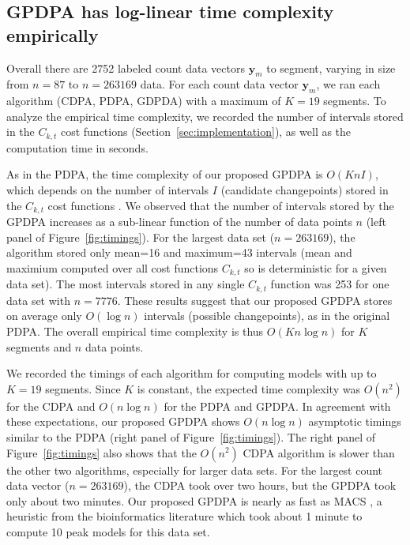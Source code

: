 \documentclass[twoside,11pt]{article}
\begin{document}
\subsection{GPDPA has log-linear time complexity empirically}
\label{sec:results_time}

Overall there are 2752 labeled count data vectors $\mathbf y_m$ to segment,
varying in size from $n=87$ to $n=263169$ data. For each count data
vector $\mathbf y_m$, we ran each algorithm (CDPA, PDPA, GDPDA) with a
maximum of $K=19$ segments.
To analyze the empirical time complexity,
we recorded the number of intervals stored in the $C_{k,t}$ cost
functions (Section~\ref{sec:implementation}), as well as the computation
time in seconds.


As in the PDPA, the time complexity of our proposed GPDPA is
$O(K n I)$, which depends on the number of intervals $I$ (candidate
changepoints) stored in the $C_{k,t}$ cost functions
\citep{pruned-dp-new}. We observed that the number of intervals stored
by the GPDPA increases as a sub-linear function of the number of data
points $n$ (left panel of Figure~\ref{fig:timings}). For the largest data
set ($n=263169$), the algorithm stored only mean=16 and maximum=43
intervals (mean and maximium computed over all cost functions
$C_{k,t}$ so is deterministic for a given data set). The most
intervals stored in any single $C_{k,t}$ function was 253 for one data set with $n=7776$. These results
suggest that our proposed GPDPA stores on average only $O(\log n)$
intervals (possible changepoints), as in the original PDPA. The
overall empirical time complexity is thus $O(K n \log n)$ for $K$
segments and $n$ data points.

We recorded the timings of each algorithm for computing models with up
to $K=19$ segments. Since $K$ is constant, the expected time
complexity was $O(n^2)$ for the CDPA and $O(n \log n)$ for the PDPA
and GPDPA. In agreement with these expectations, our proposed GPDPA
shows $O(n\log n)$ asymptotic timings similar to the PDPA (right panel of
Figure~\ref{fig:timings}). 
The right panel of
Figure~\ref{fig:timings} also shows that the $O(n^2)$ CDPA algorithm is slower than the other
two algorithms, especially for larger data sets. For the largest count
data vector ($n=263169$), the CDPA took over two hours, but the GPDPA
took only
about two minutes. Our proposed GPDPA is nearly as fast as MACS
\citep{MACS}, a heuristic from the bioinformatics literature which
took about 1 minute to compute 10 peak models for this data set. 
\end{document}
